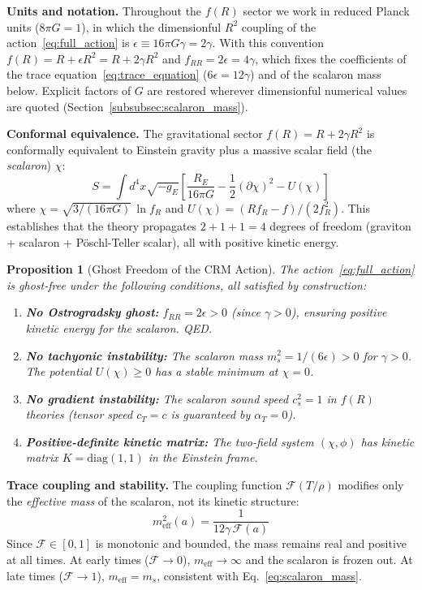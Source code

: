 \documentclass[aps,prd,twocolumn,superscriptaddress,nofootinbib]{revtex4-2}
\newtheorem{proposition}{Proposition}
\begin{document}
\textbf{Units and notation.} Throughout the $f(R)$ sector we work in reduced Planck units ($8\pi G = 1$), in which the dimensionful $R^2$ coupling of the action~\eqref{eq:full_action} is $\epsilon \equiv 16\pi G\gamma = 2\gamma$. With this convention $f(R) = R + \epsilon R^2 = R + 2\gamma R^2$ and $f_{RR} = 2\epsilon = 4\gamma$, which fixes the coefficients of the trace equation~\eqref{eq:trace_equation} ($6\epsilon = 12\gamma$) and of the scalaron mass below. Explicit factors of $G$ are restored wherever dimensionful numerical values are quoted (Section~\ref{subsubsec:scalaron_mass}).

\textbf{Conformal equivalence.} The gravitational sector $f(R) = R + 2\gamma R^2$ is conformally equivalent to Einstein gravity plus a massive scalar field (the \textit{scalaron}) $\chi$:
\begin{equation}
S = \int d^4x \sqrt{-g_E} \left[\frac{R_E}{16\pi G} - \frac{1}{2}(\partial\chi)^2 - U(\chi) \right]
\end{equation}
where $\chi = \sqrt{3/(16\pi G)}\,\ln f_R$ and $U(\chi) = (R f_R - f)/(2 f_R^2)$. This establishes that the theory propagates $2 + 1 + 1 = 4$ degrees of freedom (graviton + scalaron + P\"oschl-Teller scalar), all with positive kinetic energy.

{\sloppy
\begin{proposition}[Ghost Freedom of the CRM Action]
The action~\eqref{eq:full_action} is ghost-free under the following conditions, all satisfied by construction:
\begin{enumerate}
\item \textbf{No Ostrogradsky ghost:} $f_{RR} = 2\epsilon > 0$ (since $\gamma > 0$), ensuring positive kinetic energy for the scalaron. QED.
\item \textbf{No tachyonic instability:} The scalaron mass $m_s^2 = 1/(6\epsilon) > 0$ for $\gamma > 0$. The potential $U(\chi) \geq 0$ has a stable minimum at $\chi = 0$.
\item \textbf{No gradient instability:} The scalaron sound speed $c_s^2 = 1$ in $f(R)$ theories (tensor speed $c_T = c$ is guaranteed by $\alpha_T = 0$).
\item \textbf{Positive-definite kinetic matrix:} The two-field system $(\chi, \phi)$ has kinetic matrix $K = \mathrm{diag}(1, 1)$ in the Einstein frame.
\end{enumerate}
\end{proposition}
}

\textbf{Trace coupling and stability.} The coupling function $\mathcal{F}(T/\rho)$ modifies only the \textit{effective mass} of the scalaron, not its kinetic structure:
\begin{equation}
m_{\mathrm{eff}}^2(a) = \frac{1}{12\gamma\,\mathcal{F}(a)}
\end{equation}
Since $\mathcal{F} \in [0,1]$ is monotonic and bounded, the mass remains real and positive at all times. At early times ($\mathcal{F} \to 0$), $m_{\mathrm{eff}} \to \infty$ and the scalaron is frozen out. At late times ($\mathcal{F} \to 1$), $m_{\mathrm{eff}} = m_s$, consistent with Eq.~\eqref{eq:scalaron_mass}.
\end{document}
